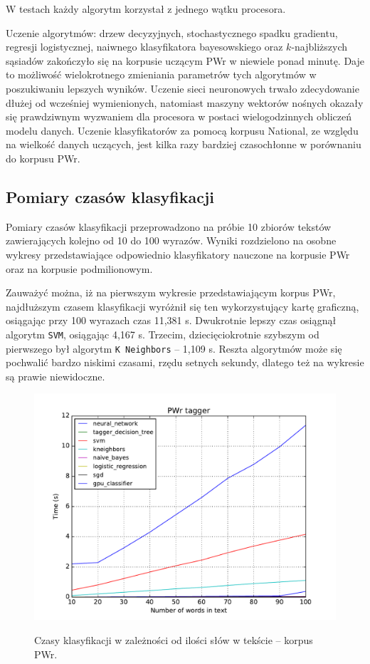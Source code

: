 W testach każdy algorytm korzystał z jednego wątku procesora.

Uczenie algorytmów: drzew decyzyjnych, stochastycznego spadku gradientu, regresji logistycznej, naiwnego klasyfikatora bayesowskiego oraz $k$-najbliższych sąsiadów zakończyło się na korpusie uczącym PWr w niewiele ponad minutę. Daje to możliwość wielokrotnego zmieniania parametrów tych algorytmów w poszukiwaniu lepszych wyników. Uczenie sieci neuronowych trwało zdecydowanie dłużej od wcześniej wymienionych, natomiast maszyny wektorów nośnych okazały się prawdziwnym wyzwaniem dla procesora w postaci wielogodzinnych obliczeń modelu danych. Uczenie klasyfikatorów za pomocą korpusu National, ze względu na wielkość danych uczących, jest kilka razy bardziej czasochłonne w porównaniu do korpusu PWr.

\newpage
\subsection{Pomiary czasów klasyfikacji}

Pomiary czasów klasyfikacji przeprowadzono na próbie 10 zbiorów tekstów zawierających kolejno od 10 do 100 wyrazów. Wyniki rozdzielono na osobne wykresy przedstawiające odpowiednio klasyfikatory nauczone na korpusie PWr oraz na korpusie podmilionowym.

Zauważyć można, iż na pierwszym wykresie przedstawiającym korpus PWr, najdłuższym czasem klasyfikacji wyróżnił się ten wykorzystujący kartę graficzną, osiągając przy 100 wyrazach czas 11,381 s. Dwukrotnie lepszy czas osiągnął algorytm \texttt{SVM}, osiągając 4,167 s. Trzecim, dziecięciokrotnie szybszym od pierwszego był algorytm \texttt{K Neighbors} -- 1,109 s. Reszta algorytmów może się pochwalić bardzo niskimi czasami, rzędu setnych sekundy, dlatego też na wykresie są prawie niewidoczne.

\begin{figure}[H]
	\centering
	\includegraphics[scale=0.8]{charts/czasy_pwr.pdf}
	\label{Rysunek}
	\caption{Czasy klasyfikacji w zależności od ilości słów w tekście -- korpus PWr.}
\end{figure}


